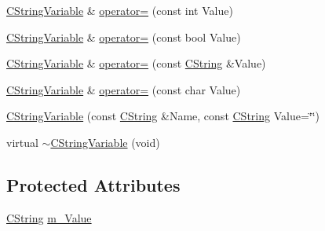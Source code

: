 \begin{DoxyCompactItemize}
\item 
\hyperlink{classCStringVariable}{C\-String\-Variable} \& \hyperlink{classCStringVariable_a412b919e198cadfbed3cf56544b24e6c}{operator=} (const int Value)
\item 
\hyperlink{classCStringVariable}{C\-String\-Variable} \& \hyperlink{classCStringVariable_a836f57b1092ee91566e1e91debf25803}{operator=} (const bool Value)
\item 
\hyperlink{classCStringVariable}{C\-String\-Variable} \& \hyperlink{classCStringVariable_ad89b24e321968762feb73f0943e0fac2}{operator=} (const \hyperlink{classCString}{C\-String} \&Value)
\item 
\hyperlink{classCStringVariable}{C\-String\-Variable} \& \hyperlink{classCStringVariable_a870645327e02885c08efb74d9633355d}{operator=} (const char Value)
\item 
\hyperlink{classCStringVariable_a33c61ebe0f7461c66da786308d1a815f}{C\-String\-Variable} (const \hyperlink{classCString}{C\-String} \&Name, const \hyperlink{classCString}{C\-String} Value=\char`\"{}\char`\"{})
\item 
virtual \hyperlink{classCStringVariable_a3dc77dd2fc4804b8e87111af8194f59b}{$\sim$\-C\-String\-Variable} (void)
\end{DoxyCompactItemize}
\subsection*{Protected Attributes}
\begin{DoxyCompactItemize}
\item 
\hyperlink{classCString}{C\-String} \hyperlink{classCStringVariable_a18e53ee780ef84bf84c1eca430b592ca}{m\-\_\-\-Value}
\end{DoxyCompactItemize}


